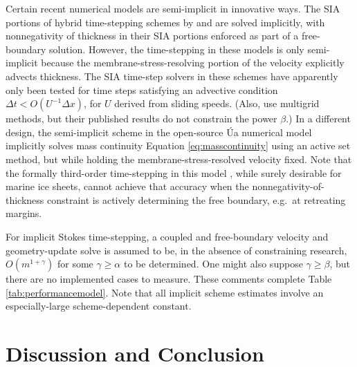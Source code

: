 \documentclass[review,letterpaper]{igs}
\begin{document}
Certain recent numerical models are semi-implicit in innovative ways.  The SIA portions of hybrid time-stepping schemes by \cite{JouvetGraeser2013} and \cite{BrinkerhoffJohnson2015} are solved implicitly, with nonnegativity of thickness in their SIA portions enforced as part of a free-boundary solution.  However, the time-stepping in these models is only semi-implicit because the membrane-stress-resolving portion of the velocity explicitly advects thickness.  The SIA time-step solvers in these schemes have apparently only been tested for time steps satisfying an advective condition $\Delta t < O(U^{-1}\Delta x)$, for $U$ derived from sliding speeds.  (Also, \cite{JouvetGraeser2013} use multigrid methods, but their published results do not constrain the power $\beta$.)
In a different design, the semi-implicit scheme in the open-source \'Ua numerical model \citep{Gudmundsson2021manual} implicitly solves mass continuity Equation \eqref{eq:masscontinuity} using an active set method, but while holding the membrane-stress-resolved velocity fixed.  Note that the formally third-order time-stepping in this model \citep{Gudmundsson2013}, while surely desirable for marine ice sheets, cannot achieve that accuracy when the nonnegativity-of-thickness constraint is actively determining the free boundary, e.g.~at retreating margins.

For implicit Stokes time-stepping, a coupled and free-boundary velocity and geometry-update solve is assumed to be, in the absence of constraining research, $O(m^{1+\gamma})$ for some $\gamma \ge \alpha$ to be determined.  One might also suppose $\gamma\ge \beta$, but there are no implemented cases to measure.  These comments complete Table \ref{tab:performancemodel}.  Note that all implicit scheme estimates involve an especially-large scheme-dependent constant.


\section{Discussion and Conclusion}
\end{document}
